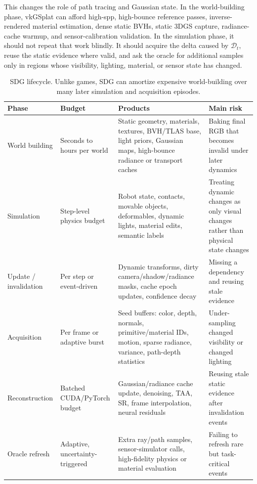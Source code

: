 \documentclass[10pt,journal,onecolumn]{IEEEtran}
\begin{document}
This changes the role of path tracing and Gaussian state. In the
world-building phase, vkGSplat can afford high-spp, high-bounce reference
passes, inverse-rendered material estimation, dense static BVHs, static 3DGS
capture, radiance-cache warmup, and sensor-calibration validation. In the
simulation phase, it should not repeat that work blindly. It should acquire the
delta caused by $\mathcal{D}_t$, reuse the static evidence where valid, and ask
the oracle for additional samples only in regions whose visibility, lighting,
material, or sensor state has changed.

\begin{table}[t]
\centering
\footnotesize
\caption{SDG lifecycle. Unlike games, SDG can amortize expensive
world-building over many later simulation and acquisition episodes.}
\label{tab:sdg-lifecycle}
\begin{tabular}{p{}p{}p{}p{}}
\toprule
\textbf{Phase} & \textbf{Budget} & \textbf{Products} & \textbf{Main risk} \\
\midrule
World building & Seconds to hours per world & Static geometry, materials, textures, BVH/TLAS base, light priors, Gaussian maps, high-bounce radiance or transport caches & Baking final RGB that becomes invalid under later dynamics \\
Simulation & Step-level physics budget & Robot state, contacts, movable objects, deformables, dynamic lights, material edits, semantic labels & Treating dynamic changes as only visual changes rather than physical state changes \\
Update / invalidation & Per step or event-driven & Dynamic transforms, dirty camera/shadow/radiance masks, cache epoch updates, confidence decay & Missing a dependency and reusing stale evidence \\
Acquisition & Per frame or adaptive burst & Seed buffers: color, depth, normals, primitive/material IDs, motion, sparse radiance, variance, path-depth statistics & Under-sampling changed visibility or changed lighting \\
Reconstruction & Batched CUDA/PyTorch budget & Gaussian/radiance cache update, denoising, TAA, SR, frame interpolation, neural residuals & Reusing stale static evidence after invalidation events \\
Oracle refresh & Adaptive, uncertainty-triggered & Extra ray/path samples, sensor-simulator calls, high-fidelity physics or material evaluation & Failing to refresh rare but task-critical events \\
\bottomrule
\end{tabular}
\end{table}
\end{document}
